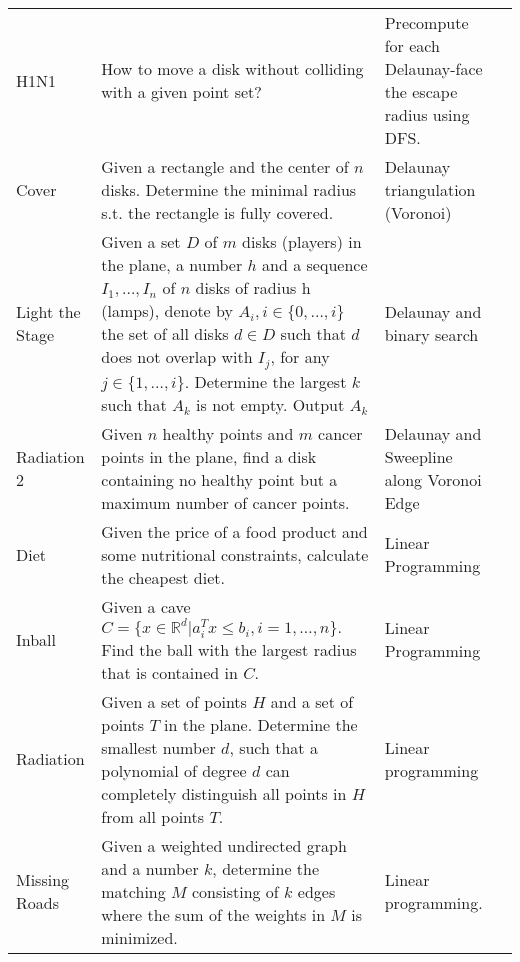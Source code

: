 \documentclass[a4paper, 10pt]{article}
\begin{document}
\begin{longtable}{ L{2cm} L{8cm} L{4cm} r}
        H1N1
        & How to move a disk without colliding with a given point set?
        & Precompute for each Delaunay-face the escape radius using DFS. &  \pageref{sec:h1n1} \\

        Cover 
        & Given a rectangle and the center of $n$ disks. Determine the minimal radius s.t. the rectangle is fully covered.
        & Delaunay triangulation (Voronoi) &  \pageref{sec:cover} \\

        Light the Stage 
        & Given a set $D$ of $m$ disks (players) in the plane, a number $h$ and a sequence $I_1,\dots,I_n$ 
            of $n$ disks of radius h (lamps), denote by $A_i, i\in \{0,\dots,i\}$ the set of all disks $d\in D$ 
            such that $d$ does not overlap with $I_j$, for any $j\in \{1,\dots,i\}$.
            Determine the largest $k$ such that $A_k$ is not empty. Output $A_k$
            & Delaunay and binary search &  \pageref{sec:light_the_stage} \\

        Radiation 2 
        & Given $n$ healthy points and $m$ cancer points in the plane, find a disk containing no 
            healthy point but a maximum number of cancer points.
        & Delaunay and Sweepline along Voronoi Edge &  \pageref{radiation_2} \\

        Diet 
        & Given the price of a food product and some nutritional constraints, calculate the cheapest diet.
        & Linear Programming &  \pageref{sec:diet} \\

        Inball 
        & Given a cave $C=\{x\in \mathbb{R} ^d|a_i^Tx\leq b_i, i=1,\dots,n\}.$ Find the ball with the largest radius that is contained in $C$.
        & Linear Programming &  \pageref{sec:inball} \\

        Radiation 
        & Given a set of points $H$ and a set of points $T$ in the plane. Determine the smallest number $d$, such that a polynomial 
            of degree $d$ can completely distinguish all points in $H$ from all points $T$.
            & Linear programming &  \pageref{sec:radiation} \\

        Missing Roads 
        & Given a weighted undirected graph and a number $k$, 
            determine the matching $M$ consisting of $k$ edges where the sum of the weights in $M$ is minimized.
        & Linear programming. & \pageref{sec:missing_roads} \\


\end{longtable}
\end{document}

